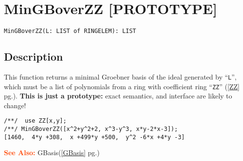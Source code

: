 \documentclass[a4paper]{mybook}
\newenvironment{command}{}{} %
\newcommand\SeeAlso{\par\textcolor{OrangeRed}{\textbf{\large See Also: }}}
\begin{document}
\section{MinGBoverZZ [PROTOTYPE]}
\label{MinGBoverZZ [PROTOTYPE]}
\begin{command} %


\begin{Verbatim}[label=syntax, rulecolor=\color{MidnightBlue},
frame=single]
MinGBoverZZ(L: LIST of RINGELEM): LIST
\end{Verbatim}


\subsection*{Description}

This function returns a minimal Groebner basis of the ideal generated by ``\verb&L&'',
which must be a list of polynomials from a ring with coefficient ring ``\verb&ZZ&'' (\ref{ZZ} pg.\pageref{ZZ}).
\textbf{This is just a prototype:} exact semantics, and interface are likely to change!
\begin{Verbatim}[label=example, rulecolor=\color{PineGreen}, frame=single]
/**/  use ZZ[x,y];
/**/ MinGBoverZZ([x^2+y^2+2, x^3-y^3, x*y-2*x-3]);
[1460,  4*y +308,  x +499*y +500,  y^2 -6*x +4*y -3]
\end{Verbatim}


\SeeAlso %
  GBasis(\ref{GBasis} pg.\pageref{GBasis})
\end{command} %
\end{document}
